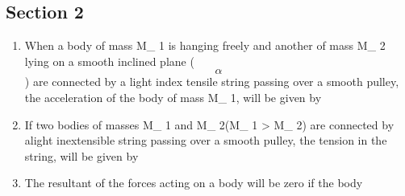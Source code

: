 \documentclass[11pt,a4paper]{article}
\begin{document}
\subsection*{Section 2}
\begin{enumerate}
\item{When a body of mass M\_ 1 is hanging freely and another of mass M\_ 2 lying on a smooth inclined plane ($$\alpha $$) are connected by a light index tensile string passing over a smooth pulley, the acceleration of the body of mass M\_ 1, will be given by
}
\\
\item{If two bodies of masses M\_ 1 and M\_ 2(M\_ 1 > M\_ 2) are connected by alight inextensible string passing over a smooth pulley, the tension in the string, will be given by}
\\
\item{The resultant of the forces acting on a body will be zero if the body}

\end{enumerate}
\end{document}
